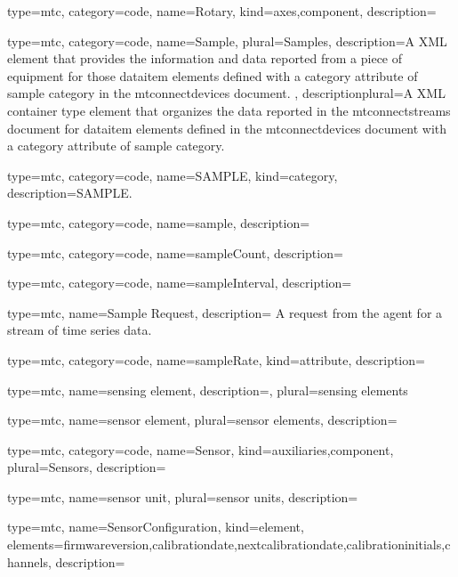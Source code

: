 {
  type=mtc,
  category=code,
  name={Rotary},
  kind={axes,component},
  description={}
}


{
  type=mtc,
  category=code,
  name={Sample},
  plural={Samples},
  description={A XML element that provides the information and data reported from a piece of equipment for those \gls{dataitem} elements defined with a \gls{category} attribute of \gls{sample category} in the \glspl{mtconnectdevice} document. },
  descriptionplural={A XML container type element that organizes the data reported in the \glspl{mtconnectstream} document for \gls{dataitem} elements defined in the \glspl{mtconnectdevice} document with a \gls{category} attribute of \gls{sample category}.}
}


{
  type=mtc,
  category=code,
  name={SAMPLE},
  kind={category},
  description={SAMPLE.}
}


{
  type=mtc,
  category=code,
  name={sample},
  description={}
}


{
  type=mtc,
  category=code,
  name={sampleCount},
  description={}
}


{
  type=mtc,
  category=code,
  name={sampleInterval},
  description={}
}


{
  type=mtc,
  name={Sample Request},
  description= {A request from the \gls{agent} for a stream of time series data.}
}


{
  type=mtc,
  category=code,
  name={sampleRate},
  kind={attribute},
  description={}
}


{
  type=mtc,
  name={sensing element},
  description={},
  plural={sensing elements}
}


{
  type=mtc,
  name={sensor element},
  plural={sensor elements},
  description={}
}


{
  type=mtc,
  category=code,
  name={Sensor},
  kind={auxiliaries,component},
  plural={Sensors},
  description= {}
}


{
  type=mtc,
  name={sensor unit},
  plural={sensor units},
  description= {}
}


{
  type=mtc,
  name={SensorConfiguration},
  kind={element},
  elements={\gls{firmwareversion},\gls{calibrationdate},\gls{nextcalibrationdate},\gls{calibrationinitials},\glspl{channel}},
  description= {}
}


